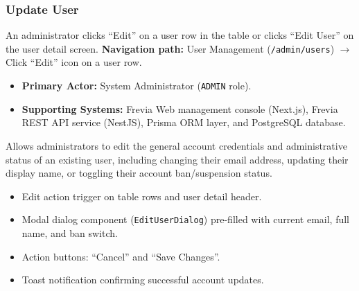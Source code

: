 \subsubsection{ Update User}

An administrator clicks ``Edit'' on a user row in the table or clicks ``Edit User'' on the user detail screen.\newline
\textbf{Navigation path:} User Management (\texttt{/admin/users}) $\rightarrow$ Click ``Edit'' icon on a user row.


\begin{itemize}[leftmargin=1.6em,topsep=3pt,itemsep=2pt,parsep=0pt,label=$\bullet$]
    \item \textbf{Primary Actor:} System Administrator (\texttt{ADMIN} role).
    \item \textbf{Supporting Systems:} Frevia Web management console (Next.js), Frevia REST API service (NestJS), Prisma ORM layer, and PostgreSQL database.
\end{itemize}

\noindent Allows administrators to edit the general account credentials and administrative status of an existing user, including changing their email address, updating their display name, or toggling their account ban/suspension status.

\begin{itemize}[leftmargin=1.6em,topsep=3pt,itemsep=2pt,parsep=0pt,label=$\bullet$]
    \item Edit action trigger on table rows and user detail header.
    \item Modal dialog component (\texttt{EditUserDialog}) pre-filled with current email, full name, and ban switch.
    \item Action buttons: ``Cancel'' and ``Save Changes''.
    \item Toast notification confirming successful account updates.
\end{itemize}

